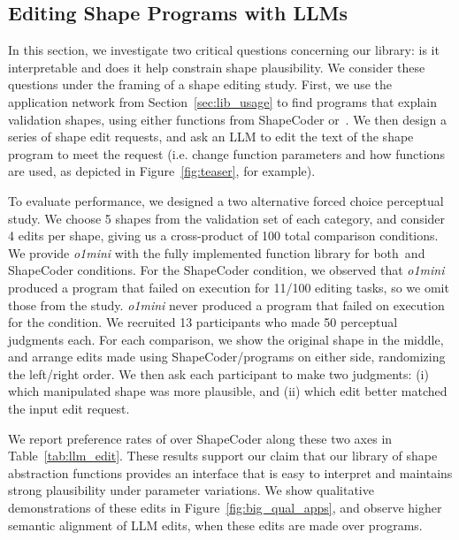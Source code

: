 \subsection{Editing Shape Programs with LLMs}
\label{sec:res_llm_edit}



In this section, we investigate two critical questions concerning our library: is it interpretable and does it help constrain shape plausibility.
We consider these questions under the framing of a shape editing study. 
First, we use the application network from Section~\ref{sec:lib_usage} to find programs that explain validation shapes, using either functions from ShapeCoder or~\methodname.
We then design a series of shape edit requests, and ask an LLM to edit the text of the shape program to meet the request (i.e. change function parameters and how functions are used, as depicted in Figure~\ref{fig:teaser}, for example).

To evaluate performance, we designed a two alternative forced choice perceptual study.
We choose 5 shapes from the validation set of each category, and consider 4 edits per shape, giving us a cross-product of 100 total comparison conditions.
We provide \textit{o1mini} with the fully implemented function library for both~\methodname and ShapeCoder conditions.
For the ShapeCoder condition, we observed that \textit{o1mini} produced a program that failed on execution for 11/100 editing tasks, so we omit those from the study. 
\textit{o1mini} never produced a program that failed on execution for the \methodname condition.
We recruited 13 participants who made 50 perceptual judgments each.
For each comparison, we show the original shape in the middle, and arrange edits made using ShapeCoder/\methodname programs on either side, randomizing the left/right order.
We then ask each participant to make two judgments: (i) which manipulated shape was more plausible, and (ii) which edit better matched the input edit request.

We report preference rates of \methodname over ShapeCoder along these two axes in Table~\ref{tab:llm_edit}. 
These results support our claim that our library of shape abstraction functions provides an interface that is easy to interpret and maintains strong plausibility under parameter variations.
We show qualitative demonstrations of these edits in Figure~\ref{fig:big_qual_apps}, and observe higher semantic alignment of LLM edits, when these edits are made over \methodname programs.

